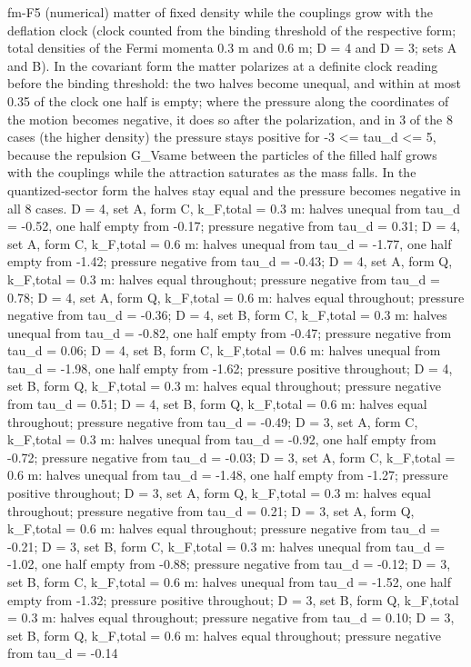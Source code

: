 \documentclass[
  10pt,
]{article}
\newenvironment{Shaded}{}{}
\newcommand{\NormalTok}[1]{#1}
\begin{document}
\begin{Shaded}
\begin{Highlighting}[]
\NormalTok{[PASS] fm{-}F5  (numerical) matter of fixed density while the couplings grow with the deflation clock (clock counted from the binding threshold of the respective form; total densities of the Fermi momenta 0.3 m and 0.6 m; D = 4 and D = 3; sets A and B). In the covariant form the matter polarizes at a definite clock reading before the binding threshold: the two halves become unequal, and within at most 0.35 of the clock one half is empty; where the pressure along the coordinates of the motion becomes negative, it does so after the polarization, and in 3 of the 8 cases (the higher density) the pressure stays positive for {-}3 \textless{}= tau\_d \textless{}= 5, because the repulsion G\_Vsame between the particles of the filled half grows with the couplings while the attraction saturates as the mass falls. In the quantized{-}sector form the halves stay equal and the pressure becomes negative in all 8 cases. D = 4, set A, form C, k\_F,total = 0.3 m: halves unequal from tau\_d = {-}0.52, one half empty from {-}0.17; pressure negative from tau\_d = 0.31; D = 4, set A, form C, k\_F,total = 0.6 m: halves unequal from tau\_d = {-}1.77, one half empty from {-}1.42; pressure negative from tau\_d = {-}0.43; D = 4, set A, form Q, k\_F,total = 0.3 m: halves equal throughout; pressure negative from tau\_d = 0.78; D = 4, set A, form Q, k\_F,total = 0.6 m: halves equal throughout; pressure negative from tau\_d = {-}0.36; D = 4, set B, form C, k\_F,total = 0.3 m: halves unequal from tau\_d = {-}0.82, one half empty from {-}0.47; pressure negative from tau\_d = 0.06; D = 4, set B, form C, k\_F,total = 0.6 m: halves unequal from tau\_d = {-}1.98, one half empty from {-}1.62; pressure positive throughout; D = 4, set B, form Q, k\_F,total = 0.3 m: halves equal throughout; pressure negative from tau\_d = 0.51; D = 4, set B, form Q, k\_F,total = 0.6 m:}
\NormalTok{halves equal throughout; pressure negative from tau\_d = {-}0.49; D = 3, set A, form C, k\_F,total = 0.3 m: halves unequal from tau\_d = {-}0.92, one half empty from {-}0.72; pressure negative from tau\_d = {-}0.03; D = 3, set A, form C, k\_F,total = 0.6 m: halves unequal from tau\_d = {-}1.48, one half empty from {-}1.27; pressure positive throughout; D = 3, set A, form Q, k\_F,total = 0.3 m: halves equal throughout; pressure negative from tau\_d = 0.21; D = 3, set A, form Q, k\_F,total = 0.6 m: halves equal throughout; pressure negative from tau\_d = {-}0.21; D = 3, set B, form C, k\_F,total = 0.3 m: halves unequal from tau\_d = {-}1.02, one half empty from {-}0.88; pressure negative from tau\_d = {-}0.12; D = 3, set B, form C, k\_F,total = 0.6 m: halves unequal from tau\_d = {-}1.52, one half empty from {-}1.32; pressure positive throughout; D = 3, set B, form Q, k\_F,total = 0.3 m: halves equal throughout; pressure negative from tau\_d = 0.10; D = 3, set B, form Q, k\_F,total = 0.6 m: halves equal throughout; pressure negative from tau\_d = {-}0.14}

\end{Highlighting}
\end{Shaded}
\end{document}
